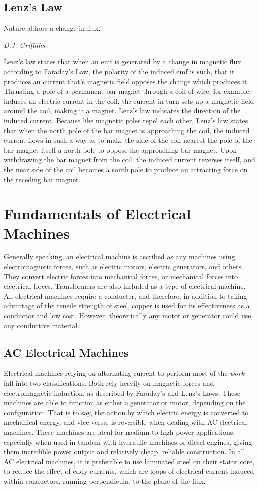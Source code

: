\documentclass[11pt,a4paper]{article}
\begin{document}
\subsection{Lenz's Law}
\epigraph{Nature abhors a change in flux.}{\textit{D.J. Griffiths}}
Lenz's law states that when an emf is generated by a change in magnetic flux according to Faraday's Law, the polarity of the induced emf is such, that it produces an current that's magnetic field opposes the change which produces it. Thrusting a pole of a permanent bar magnet through a coil of wire, for example, induces an electric current in the coil; the current in turn sets up a magnetic field around the coil, making it a magnet. Lenz’s law indicates the direction of the induced current. Because like magnetic poles repel each other, Lenz’s law states that when the north pole of the bar magnet is approaching the coil, the induced current flows in such a way as to make the side of the coil nearest the pole of the bar magnet itself a north pole to oppose the approaching bar magnet. Upon withdrawing the bar magnet from the coil, the induced current reverses itself, and the near side of the coil becomes a south pole to produce an attracting force on the receding bar magnet.\cite{e5}
\section{Fundamentals of Electrical Machines}
Generally speaking, an electrical machine is ascribed as any machines using electromagnetic forces, such as electric motors, electric generators, and others. They convert electric forces into mechanical forces, or mechanical forces into electrical forces. Transformers are also included as a type of electrical machine. All electrical machines require a conductor, and therefore, in addition to taking advantage of the tensile strength of steel, copper is used for its effectiveness as a conductor and low cost. However, theoretically any motor or generator could use any conductive material.
\subsection{AC Electrical Machines}
Electrical machines relying on alternating current to perform most of the \textit{work} fall into two classifications. Both rely heavily on magnetic forces and electromagnetic induction, as described by Faraday's and Lenz's Laws. These machines are able to function as either a generator or motor, depending on the configuration. That is to say, the action by which electric energy is converted to mechanical energy, and vice-versa, is reversible when dealing with AC electrical machines. These machines are ideal for medium to high power applications, especially when used in tandem with hydraulic machines or diesel engines, giving them incredible power output and relatively cheap, reliable construction. In all AC electrical machines, it is preferable to use laminated steel on their stator core, to reduce the effect of eddy currents, which are loops of electrical current induced within conductors, running perpendicular to the plane of the flux.
\end{document}
